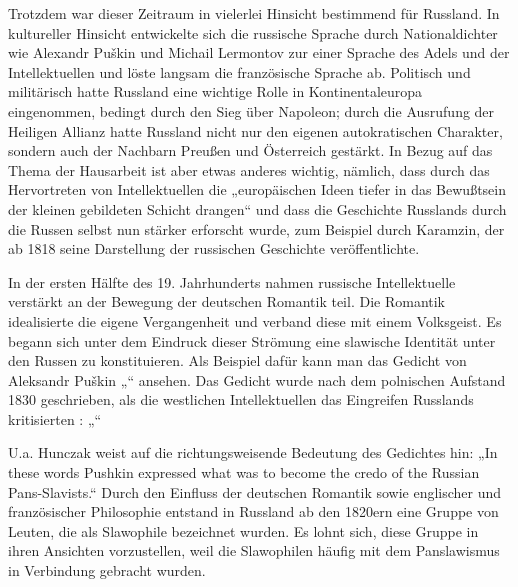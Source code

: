 \documentclass{../../sem_paper}
\begin{document}
Trotzdem war dieser Zeitraum in vielerlei Hinsicht bestimmend für Russland. In kultureller
Hinsicht entwickelte sich die russische Sprache durch Nationaldichter wie Alexandr Puškin
und Michail Lermontov zur einer Sprache des Adels und der Intellektuellen und löste langsam
die französische Sprache ab. Politisch und militärisch hatte Russland eine wichtige Rolle in
Kontinentaleuropa eingenommen, bedingt durch den Sieg über Napoleon; durch die
Ausrufung der Heiligen Allianz hatte Russland nicht nur den eigenen autokratischen
Charakter, sondern auch der Nachbarn Preußen und Österreich gestärkt. In Bezug auf das
Thema der Hausarbeit ist aber etwas anderes wichtig, nämlich, dass durch das Hervortreten
von Intellektuellen die „europäischen Ideen tiefer in das Bewußtsein der kleinen gebildeten
Schicht drangen“\autocite[117]{kohn} und dass die Geschichte Russlands durch die Russen
selbst nun stärker erforscht wurde, zum Beispiel durch Karamzin, der ab 1818 seine
Darstellung der russischen Geschichte veröffentlichte.

In der ersten Hälfte des 19. Jahrhunderts nahmen russische Intellektuelle verstärkt an der
Bewegung der deutschen Romantik teil. Die Romantik idealisierte die eigene Vergangenheit
und verband diese mit einem Volksgeist. Es begann sich unter dem Eindruck dieser Strömung
eine slawische Identität unter den Russen zu konstituieren. Als Beispiel dafür kann man das
Gedicht von Aleksandr Puškin „“ ansehen. Das Gedicht wurde nach
dem polnischen Aufstand 1830 geschrieben, als die westlichen Intellektuellen das Eingreifen
Russlands kritisierten :
„“\autocite[282]{pushkin}

U.a. Hunczak\autocite[89]{hunczak} weist auf die richtungsweisende Bedeutung des Gedichtes hin: „In
these words Pushkin expressed what was to become the credo of the Russian Pans-Slavists.“
Durch den Einfluss der deutschen Romantik sowie englischer und französischer Philosophie
entstand in Russland ab den 1820ern eine Gruppe von Leuten, die als Slawophile bezeichnet
wurden. Es lohnt sich, diese Gruppe in ihren Ansichten vorzustellen, weil die Slawophilen
häufig mit dem Panslawismus in Verbindung gebracht wurden.
\end{document}
